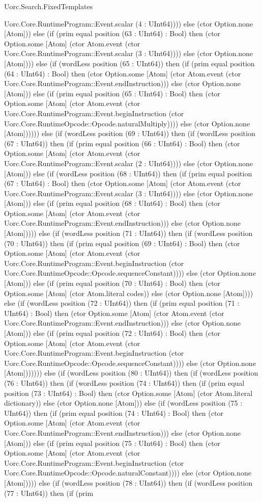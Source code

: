 \begin{lexlean}{Uorc.Search.FixedTemplates}
\begin{semanticmodule}
{Uorc.Core.RuntimeProgram::Event.scalar (4 : UInt64)))) else (ctor Option.none [Atom])) else (if (prim equal position (63 : UInt64) : Bool) then (ctor Option.some [Atom] (ctor Atom.event (ctor Uorc.Core.RuntimeProgram::Event.scalar (3 : UInt64)))) else (ctor Option.none [Atom]))) else (if (wordLess position (65 : UInt64)) then (if (prim equal position (64 : UInt64) : Bool) then (ctor Option.some [Atom] (ctor Atom.event (ctor Uorc.Core.RuntimeProgram::Event.endInstruction))) else (ctor Option.none [Atom])) else (if (prim equal position (65 : UInt64) : Bool) then (ctor Option.some [Atom] (ctor Atom.event (ctor Uorc.Core.RuntimeProgram::Event.beginInstruction (ctor Uorc.Core.RuntimeOpcode::Opcode.naturalMultiply)))) else (ctor Option.none [Atom]))))) else (if (wordLess position (69 : UInt64)) then (if (wordLess position (67 : UInt64)) then (if (prim equal position (66 : UInt64) : Bool) then (ctor Option.some [Atom] (ctor Atom.event (ctor Uorc.Core.RuntimeProgram::Event.scalar (2 : UInt64)))) else (ctor Option.none [Atom])) else (if (wordLess position (68 : UInt64)) then (if (prim equal position (67 : UInt64) : Bool) then (ctor Option.some [Atom] (ctor Atom.event (ctor Uorc.Core.RuntimeProgram::Event.scalar (3 : UInt64)))) else (ctor Option.none [Atom])) else (if (prim equal position (68 : UInt64) : Bool) then (ctor Option.some [Atom] (ctor Atom.event (ctor Uorc.Core.RuntimeProgram::Event.endInstruction))) else (ctor Option.none [Atom])))) else (if (wordLess position (71 : UInt64)) then (if (wordLess position (70 : UInt64)) then (if (prim equal position (69 : UInt64) : Bool) then (ctor Option.some [Atom] (ctor Atom.event (ctor Uorc.Core.RuntimeProgram::Event.beginInstruction (ctor Uorc.Core.RuntimeOpcode::Opcode.sequenceConstant)))) else (ctor Option.none [Atom])) else (if (prim equal position (70 : UInt64) : Bool) then (ctor Option.some [Atom] (ctor Atom.literal codes)) else (ctor Option.none [Atom]))) else (if (wordLess position (72 : UInt64)) then (if (prim equal position (71 : UInt64) : Bool) then (ctor Option.some [Atom] (ctor Atom.event (ctor Uorc.Core.RuntimeProgram::Event.endInstruction))) else (ctor Option.none [Atom])) else (if (prim equal position (72 : UInt64) : Bool) then (ctor Option.some [Atom] (ctor Atom.event (ctor Uorc.Core.RuntimeProgram::Event.beginInstruction (ctor Uorc.Core.RuntimeOpcode::Opcode.sequenceConstant)))) else (ctor Option.none [Atom])))))) else (if (wordLess position (80 : UInt64)) then (if (wordLess position (76 : UInt64)) then (if (wordLess position (74 : UInt64)) then (if (prim equal position (73 : UInt64) : Bool) then (ctor Option.some [Atom] (ctor Atom.literal dictionary)) else (ctor Option.none [Atom])) else (if (wordLess position (75 : UInt64)) then (if (prim equal position (74 : UInt64) : Bool) then (ctor Option.some [Atom] (ctor Atom.event (ctor Uorc.Core.RuntimeProgram::Event.endInstruction))) else (ctor Option.none [Atom])) else (if (prim equal position (75 : UInt64) : Bool) then (ctor Option.some [Atom] (ctor Atom.event (ctor Uorc.Core.RuntimeProgram::Event.beginInstruction (ctor Uorc.Core.RuntimeOpcode::Opcode.naturalConstant)))) else (ctor Option.none [Atom])))) else (if (wordLess position (78 : UInt64)) then (if (wordLess position (77 : UInt64)) then (if (prim }
\end{semanticmodule}
\end{lexlean}
